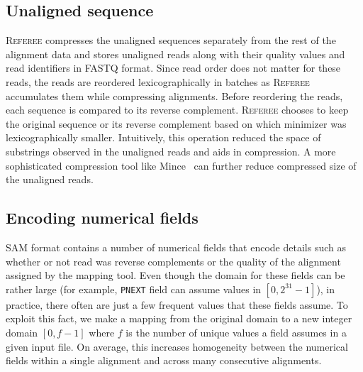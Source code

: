 \documentclass[12pt]{cmuthesis}
\newcommand{\refer}{\textsc{Referee}\xspace}
\begin{document}

  \subsection{Unaligned sequence}

  \refer compresses the unaligned sequences separately from the rest of the alignment data and stores unaligned reads along with their quality values and read identifiers in FASTQ format. Since read order does not matter for these reads, the reads are reordered lexicographically in batches as \refer accumulates them while compressing alignments. Before reordering the reads, each sequence is compared to its reverse complement. \refer chooses to keep the original sequence or its reverse complement based on which minimizer was lexicographically smaller. Intuitively, this operation reduced the space of substrings observed in the unaligned reads and aids in compression. A more sophisticated compression tool like Mince~\cite{Mince} can further reduce compressed size of the unaligned reads.










  \subsection{Encoding numerical fields}

  SAM format contains a number of numerical fields that encode details such as whether or not read was reverse complements or the quality of the alignment assigned by the mapping tool. Even though the domain for these fields can be rather large (for example, \texttt{PNEXT} field can assume values in $[0, 2^{31}-1]$), in practice, there often are just a few frequent values that these fields assume. To exploit this fact, we make a mapping from the original domain to a new integer domain $[0, f - 1]$ where $f$ is the number of unique values a field assumes in a given input file. On average, this increases homogeneity between the numerical fields within a single alignment and across many consecutive alignments.
\end{document}

